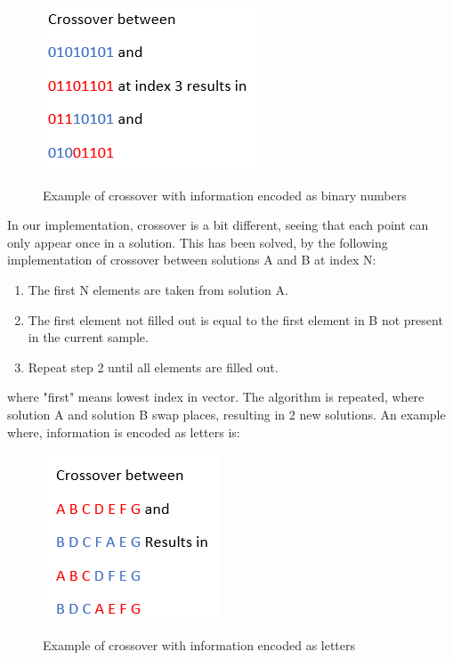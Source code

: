 \begin{figure}[h]
	\centering
	{\includegraphics[scale=0.5]{Images/crossover_binary.PNG}}\\[0.5cm]
	\caption{Example of crossover with information encoded as binary numbers}
	\label{fig:crossover_binary}
\end{figure}



In our implementation, crossover is a bit different, seeing that each point can only appear once in a solution. This has been solved, by the following implementation of crossover between solutions A and B at index N:
\begin{enumerate}
	\item The first N elements are taken from solution A.
	\item The first element not filled out is equal to the first element in B not present in the current sample.
	\item Repeat step 2 until all elements are filled out.
\end{enumerate}

where "first" means lowest index in vector. The algorithm is repeated, where solution A and solution B swap places, resulting in 2 new solutions. An example where, information is encoded as letters is:

\begin{figure}[h]
	\centering
	{\includegraphics[scale=0.5]{Images/crossover_letters.PNG}}\\[0.5cm]
	\caption{Example of crossover with information encoded as letters}
	\label{fig:crossover_letters}
\end{figure}

